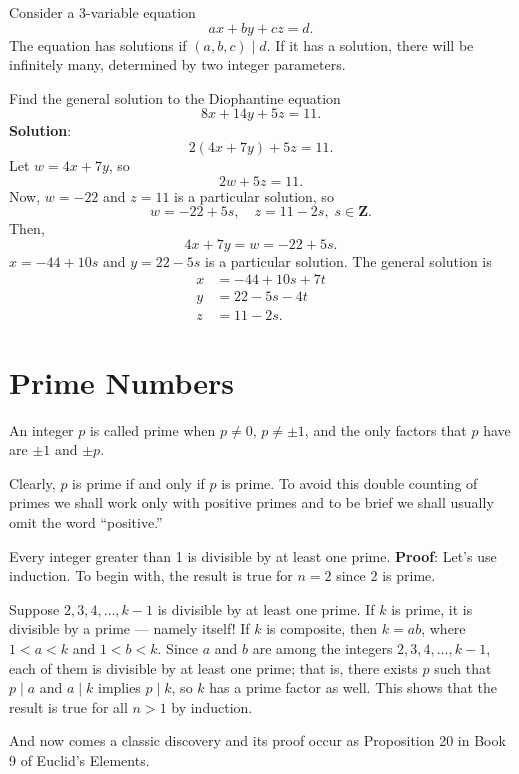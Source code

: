 Consider a 3-variable equation
\[ ax+by+cz=d. \]
The equation has solutions if $ (a,b,c)\mid d $. If it has a solution, there will be infinitely many,
determined by two integer parameters.
\begin{Exercise}{}{}
    Find the general solution to the Diophantine equation
    \[ 8x+14y+5z=11. \]
    \tcblower{}
    \textbf{Solution}:
    \[ 2(4x+7y)+5z=11. \]
    Let $ w=4x+7y $, so
    \[ 2w+5z=11. \]
    Now, $ w=-22 $ and $ z=11 $ is a particular solution, so
    \[ w=-22+5s,\quad z=11-2s,\; s\in\mathbf{Z}. \]
    Then,
    \[ 4x+7y=w=-22+5s. \]
    $ x=-44+10s $ and $ y=22-5s $ is a particular solution. The general solution is
    \begin{align*}
        x & =-44+10s+7t \\
        y & =22-5s-4t   \\
        z & =11-2s.
    \end{align*}
\end{Exercise}
\section{Prime Numbers}
\begin{Definition}{}{}
    An integer $ p $ is called prime when $ p\ne 0 $, $ p\ne \pm 1 $, and the only factors that $ p $
    have are $ \pm 1 $ and $ \pm p $.
\end{Definition}
Clearly, $p$ is prime if and only if $p$ is prime. To avoid this double counting
of primes we shall work only with positive primes and to be brief we shall usually
omit the word ``positive.''
\begin{Lemma}{}{}
    Every integer greater than 1 is divisible by at least one prime.
    \tcblower{}
    \textbf{Proof}: Let's use induction. To begin with, the result is true for $ n=2 $ since $ 2 $ is prime.

    Suppose $ 2,3,4,\ldots,k-1 $ is divisible by at least one prime. If $ k $ is prime, it is divisible
    by a prime --- namely itself! If $ k $ is composite, then $ k=ab $, where $ 1<a<k $ and $ 1<b<k $. Since
    $ a $ and $ b $ are among the integers $ 2,3,4,\ldots,k-1 $, each of them is divisible by at least one prime;
    that is, there exists $ p $ such that $ p\mid a $ and $ a\mid k $ implies $ p\mid k $, so $ k $ has a prime factor
    as well. This shows that the result is true for all $ n>1 $ by induction.
\end{Lemma}
And now comes a classic discovery and its proof occur as Proposition 20 in
Book 9 of Euclid's Elements.

